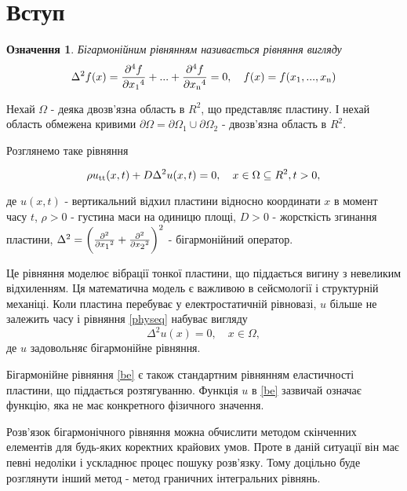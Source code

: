\documentclass[12pt]{report}
\newtheorem{definition}{Означення}
\begin{document}
\tableofcontents

\chapter*{Вступ}
  
\begin{definition}
\label{be}
 	Бігармонійним рівнянням називається рівняння вигляду
  	$$
		\Delta^{2}f(x)=\frac{\partial^{4}f}{\partial x\textsubscript{1}^4}+...+\frac{\partial^{4}f}{\partial x\textsubscript{n}^4}=0,\quad f(x)=f(x\textsubscript{1},...,x\textsubscript{n})
	$$
\end{definition}

Нехай $\Omega$ - деяка двозв'язна область в $R^2$, що представляє пластину. І нехай область обмежена кривими $\partial\Omega=\partial\Omega_1\cup\partial\Omega_2$ - двозв'язна область в $R^2$. 

Розглянемо таке рівняння

\begin{equation} 
\label{physeq}
	\rho u\textsubscript{tt}(x,t)+D\Delta^{2} u(x,t)=0,
	\quad x\in \Omega\subseteq R^2,t>0,
\end{equation}

де $u(x,t)$ - вертикальний відхил пластини відносно координати $x$ в момент часу $t$, $\rho >0$ - густина маси на одиницю площі, $D >0$ - жорсткість згинання пластини, $\Delta^{2}=\bigg(\frac{\partial^{2}}{\partial x\textsubscript{1}^2}+\frac{\partial^{2}}{\partial x\textsubscript{2}^2}\bigg)^2$ - бігармонійний оператор.

Це рівняння моделює вібрації тонкої пластини, що піддається вигину з невеликим відхиленням. Ця математична модель є важливою в сейсмології і структурній механіці. 
Коли пластина перебуває у електростатичній рівновазі, $ u$ більше не залежить часу і рівняння \eqref{physeq} набуває вигляду
$$
	\Delta^{2}u(x)=0,\quad x\in\Omega,
$$
де $ u$ задовольняє бігармонійне рівняння.
 
 Бігармонійне рівняння \eqref{be} є також стандартним рівнянням еластичності пластини, що піддається розтягуванню. Функція $ u$ в \eqref{be} зазвичай означає функцію, яка не має конкретного фізичного значення.
 
Розв'язок бігармонічного рівняння можна обчислити методом скінченних елементів для будь-яких коректних крайових умов. Проте в даній ситуації він має певні недоліки і ускладнює процес пошуку розв'язку. Тому доцільно буде розглянути інший метод - метод граничних інтегральних рівнянь.
\end{document}
